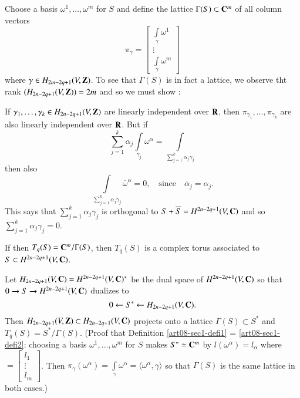 \begin{definition}\label{art08-sec1-defi1}
Choose a basis $\omega^{1},\ldots,\omega^{m}$ for $S$ and define the lattice $\Gamma(S)\subset \mathbf{C}^{m}$ of all column vectors 
$$
\pi_{\gamma}=\left[\begin{smallmatrix} \int\limits_{\gamma}\omega^{1}\\ \vdots\\ \int\limits_{\gamma}\omega^{m}\end{smallmatrix}\right]
$$ 
where $\gamma\in H_{2m-2q+1}(V,\mathbf{Z})$. To see that $\Gamma(S)$ is in fact a lattice, we observe tht rank $(H_{2n-2q+1}(V,\mathbf{Z}))=2m$ and so we must show :
\end{definition}

If $\gamma_{1},\ldots,\gamma_{k}\in H_{2n-2q+1}(V,\mathbf{Z})$ are linearly independent over $\mathbf{R}$, then $\pi_{\gamma_{1}},\ldots,\pi_{\gamma_{k}}$ are also linearly independent over $\mathbf{R}$. But if 
$$
\sum\limits^{k}_{j=1}\alpha_{j}\int\limits_{\gamma_{j}}\omega^{\alpha}=\int\limits_{\sum\limits^{k}_{j=1}\alpha_{j}\gamma_{j}}
$$\pageoriginale
then also
$$
\int\limits_{\sum\limits^{k}_{j=1}\alpha_{j}\gamma_{j}}\overline{\omega}^{\alpha}=0,\quad\text{since}\quad \overline{\alpha}_{j}=\alpha_{j}.
$$
This says that $\sum\limits^{k}_{j=1}\alpha_{j}\gamma_{j}$ is orthogonal to $S+\overline{S}=H^{2n-2q+1}(V,\mathbf{C})$ and so $\sum\limits^{k}_{j=1}\alpha_{j}\gamma_{j}=0$.

If then $T_{q}(S)=\mathbf{C}^{m}/\Gamma(S)$, then $T_{q}(S)$ is a complex torus associated to $S\subset H^{2n-2q+1}(V,\mathbf{C})$.

\begin{definition}\label{art08-sec1-defi2}
Let $H_{2n-2q+1}(V,\mathbf{C})=H^{2n-2q+1}(V,\mathbf{C})^{*}$ be the dual space of $H^{2n-2q+1}(V,\mathbf{C})$ so that $0\to S\to H^{2n-2q+1}(V,\mathbf{C})$ dualizes to 
\begin{equation}
0\leftarrow S^{*}\leftarrow H_{2n-2q+1}(V,\mathbf{C}).\label{art08-sec1-eq1.5}
\end{equation}
Then $H_{2n-2q+1}(V,\mathbf{Z})\subset H_{2n-2q+1}(V,\mathbf{C})$ projects onto a lattice $\Gamma(S)\subset S^{*}$ and $T_{q}(S)=S^{*}/\Gamma(S)$. (Proof that Definition \ref{art08-sec1-defi1} = \ref{art08-sec1-defi2}: choosing a basis $\omega^{1},\ldots,\omega^{m}$ for $S$ makes $S^{*}\simeq \mathbf{C}^{m}$ by $l(\omega^{\alpha})=l_{\alpha}$ where $=\left[\begin{smallmatrix} l_{1}\\ \vdots \\ l_{m}\end{smallmatrix}\right]$. Then $\pi_{\gamma}(\omega^{\alpha})=\int\limits_{\gamma}\omega^{\alpha}=\langle \omega^{\alpha},\gamma\rangle$ so that $\Gamma(S)$ is the same lattice in both cases.)
\end{definition}

